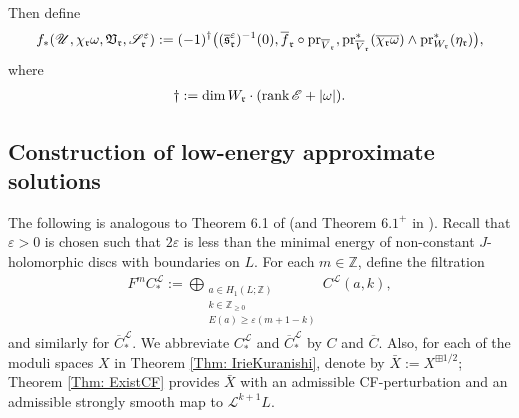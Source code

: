 \documentclass[10pt]{amsart}
\numberwithin{equation}{section}
\theoremstyle{plain}
\theoremstyle{definition}
\theoremstyle{remark}
\numberwithin{equation}{section}
\newcommand{\Z}{\mathbb{Z}}
\newcommand{\rank}{\textup{rank}}
\newcommand{\ol}[1]{\overline{#1}}
\newcommand{\mf}[1]{\mathfrak{#1}}
\newcommand{\ms}[1]{\mathscr{#1}}
\newcommand{\pr}{\textup{pr}}
\newcommand{\CFr}{C_*^\mathscr{L}}
\newcommand{\CCFr}{\ol{C}_*^\mathscr{L}}
\begin{document}
{\begin{enumerate}
\end{enumerate}
Then define 
\begin{align}\label{Eq: CFpushforward}
	f_*(\ms{U}, \chi_\mf{r}\omega, \mf{V}_\mf{r}, \ms{S}_\mf{r}^\varepsilon) := (-1)^\dagger\big((\ol{\mf{s}}_\mf{r}^\varepsilon)^{-1}(0), \ol{f}_\mf{r}\circ \pr_{\ol{V}_\mf{r}}, \pr_{\ol{V}_\mf{r}}^*(\ol{\chi_{\mf{r}}\omega}) \wedge \pr^*_{W_\mf{r}}(\eta_\mf{r})\big),
\end{align}
where 
\begin{align*}
	\dagger := \dim W_\mf{r} \cdot (\rank \,\ms{E} + |\omega|).
\end{align*}






\subsection{Construction of low-energy approximate solutions}


The following is analogous to Theorem 6.1 of \cite{Irie2} (and Theorem $6.1^+$ in \cite{IrieErratum}).
Recall that $\varepsilon>0$ is chosen such that $2\varepsilon$ is less than the minimal energy of non-constant $J$-holomorphic discs with boundaries on $L$.
For each $m\in \Z$, define the filtration
\begin{align*}
	F^m \CFr:= \bigoplus_{\substack{a\in H_1(L;\Z)\\ k\in\Z_{\geq 0} \\ E(a)\geq \varepsilon(m+1-k)}} C^\mathscr{L}(a,k),
\end{align*}
and similarly for $\CCFr$.  We abbreviate $\CFr$ and $\CCFr$ by $C$ and $\ol{C}$.
Also, for each of the moduli spaces $X$ in Theorem \ref{Thm: IrieKuranishi}, denote by $\bar X:=X^{\boxplus 1/2}$; Theorem \ref{Thm: ExistCF} provides $\bar X$ with an admissible CF-perturbation and an admissible strongly smooth map to $\ms{L}^{k+1} L$.




}
\end{document}
